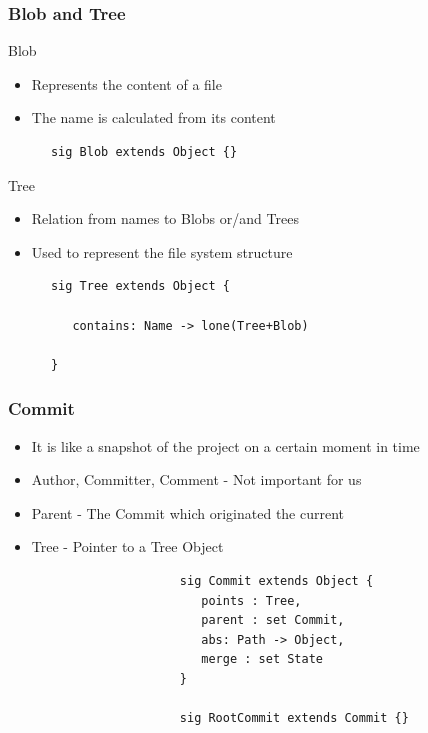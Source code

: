 \documentclass{beamer}
\begin{document}
\begin{frame}[fragile]
   \frametitle{Blob and Tree}
   \begin{block}{Blob}
      \begin{itemize}
         \item Represents the content of a file
         \item The name is calculated from its content
      \end{itemize}
      \tiny
      \color{blue}
      \begin{lstlisting}
      sig Blob extends Object {}
      \end{lstlisting}
   \end{block}
   \begin{block}{Tree}
      \begin{itemize}
         \item Relation from names to Blobs or/and Trees
         \item Used to represent the file system structure
      \end{itemize}
      \tiny
      \color{blue}
      \begin{lstlisting}
      sig Tree extends Object {
         
         contains: Name -> lone(Tree+Blob)
      
      }
      \end{lstlisting}
   \end{block}
\end{frame}




\begin{frame}[fragile]
   \frametitle{Commit}
   \begin{itemize}
      \item It is like a snapshot of the project on a certain moment
      in time
      \item Author, Committer, Comment - Not important for us
      \item Parent - The Commit which originated the current
      \item Tree - Pointer to a Tree Object
   \end{itemize}
   \tiny
   \color{blue}
   \begin{lstlisting}
                        sig Commit extends Object {
                           points : Tree,
                           parent : set Commit,
                           abs: Path -> Object,
                           merge : set State
                        }
                           
                        sig RootCommit extends Commit {}
\end{lstlisting}
\end{frame}
\end{document}
